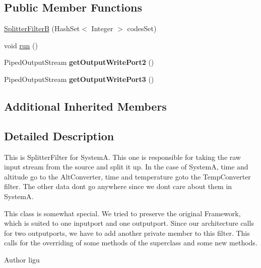 \subsection*{Public Member Functions}
\begin{DoxyCompactItemize}
\item 
\hyperlink{class_system_b_1_1_splitter_filter_b_a96c6f849d2f9702cfe12ea9cedd247c5}{Splitter\+Filter\+B} (Hash\+Set$<$ Integer $>$ codes\+Set)
\item 
void \hyperlink{class_system_b_1_1_splitter_filter_b_a2be14d19f7f2233fc3c17a105ae0e971}{run} ()
\item 
\hypertarget{class_system_b_1_1_splitter_filter_b_a58188c6b844c61bbb37f2cf95d282f2c}{}Piped\+Output\+Stream {\bfseries get\+Output\+Write\+Port2} ()\label{class_system_b_1_1_splitter_filter_b_a58188c6b844c61bbb37f2cf95d282f2c}

\item 
\hypertarget{class_system_b_1_1_splitter_filter_b_ab0030ee76c8746751d28d14d1d0d5f78}{}Piped\+Output\+Stream {\bfseries get\+Output\+Write\+Port3} ()\label{class_system_b_1_1_splitter_filter_b_ab0030ee76c8746751d28d14d1d0d5f78}

\end{DoxyCompactItemize}
\subsection*{Additional Inherited Members}


\subsection{Detailed Description}
This is Splitter\+Filter for System\+A. This one is responsible for taking the raw input stream from the source and split it up. In the case of System\+A, time and altitude go to the Alt\+Converter, time and temperature goto the Temp\+Converter filter. The other data don\textquotesingle{}t go anywhere since we don\textquotesingle{}t care about them in System\+A.

This class is somewhat special. We tried to preserve the original Framework, which is suited to one inputport and one outputport. Since our architecture calls for two outputports, we have to add another private member to this filter. This calls for the overriding of some methods of the superclass and some new methods. \begin{DoxyAuthor}{Author}
ligu 
\end{DoxyAuthor}


